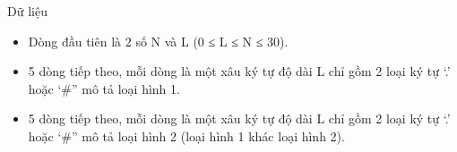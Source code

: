 Dữ liệu  
\begin{itemize}
	\item     Dòng đầu tiên là 2 số N và L (0 ≤ L ≤ N ≤ 30).   
	\item     5 dòng tiếp theo, mỗi dòng là một xâu ký tự độ dài L chỉ gồm 2 loại ký tự ‘.’ hoặc ‘\#” mô tả loại hình 1.   
	\item     5 dòng tiếp theo, mỗi dòng là một xâu ký tự độ dài L chỉ gồm 2 loại ký tự ‘.’ hoặc ‘\#” mô tả loại hình 2 (loại hình 1 khác loại hình 2).   
\end{itemize}